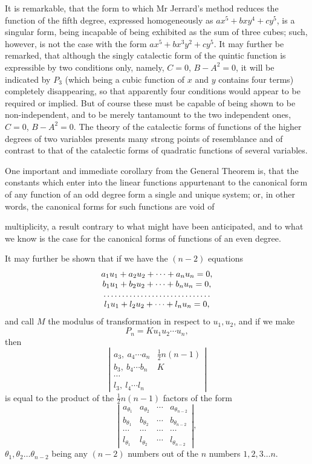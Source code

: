 \documentclass[11pt]{article}
\newcommand{\sourcepage}[1]{\marginpar{\scriptsize p.~#1}}
\begin{document}
{{It is remarkable, that the form to which Mr Jerrard's method reduces the function of the fifth degree, expressed homogeneously as $ax^5+bxy^4+cy^5$, is a singular form, being incapable of being exhibited as the sum of three cubes; such, however, is not the case with the form $ax^5+bx^3y^2+cy^5$. It may further be remarked, that although the singly catalectic form of the quintic function is expressible by two conditions only, namely, $C=0$, $B-A^2=0$, it will be indicated by $P_3$ (which being a cubic function of $x$ and $y$ contains four terms) completely disappearing, so that apparently four conditions would appear to be required or implied. But of course these must be capable of being shown to be non-independent, and to be merely tantamount to the two independent ones, $C=0$, $B-A^2=0$. The theory of the catalectic forms of functions of the higher degrees of two variables presents many strong points of resemblance and of contrast to that of the catalectic forms of quadratic functions of several variables.

One important and immediate corollary from the General Theorem is, that the constants which enter into the linear functions appurtenant to the canonical form of any function of an odd degree form a single and unique system; or, in other words, the canonical forms for such functions are void of

\sourcepage{212}
multiplicity, a result contrary to what might have been anticipated, and to what we know is the case for the canonical forms of functions of an even degree.

It may further be shown that if we have the $(n-2)$ equations
\[
\begin{array}{c}
a_1u_1+a_2u_2+\cdots+a_nu_n=0,\\
b_1u_1+b_2u_2+\cdots+b_nu_n=0,\\
\dotfill\\
l_1u_1+l_2u_2+\cdots+l_nu_n=0,
\end{array}
\]
and call $M$ the modulus of transformation in respect to $u_1,u_2$, and if we make
\[
 P_n=Ku_1u_2\cdots u_n,
\]
then
\[
\left|
\begin{array}{cc}
a_3,\ a_4\cdots a_n&\frac12 n(n-1)\\
b_3,\ b_4\cdots b_n&K\\
\cdots&\\
l_3,\ l_4\cdots l_n&
\end{array}
\right|
\]
is equal to the product of the $\frac12 n(n-1)$ factors of the form
\[
\left|
\begin{array}{cccc}
a_{\theta_1}&a_{\theta_2}&\cdots&a_{\theta_{n-2}}\\
b_{\theta_1}&b_{\theta_2}&\cdots&b_{\theta_{n-2}}\\
\cdots&\cdots&\cdots&\cdots\\
l_{\theta_1}&l_{\theta_2}&\cdots&l_{\theta_{n-2}}
\end{array}
\right|,
\]
$\theta_1,\theta_2\ldots\theta_{n-2}$ being any $(n-2)$ numbers out of the $n$ numbers $1,2,3\ldots n$.

}}
\end{document}
